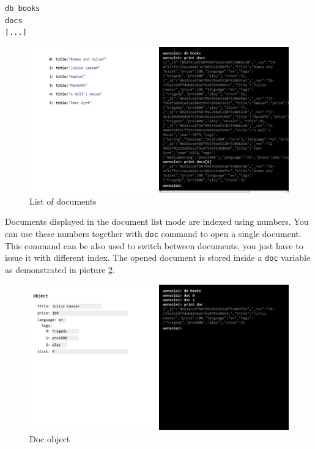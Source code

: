 \begin{verbatim}
db books
docs
[...]
\end{verbatim}
 

\begin{figure}
\centering
\includegraphics[width=\textwidth]{../../manual/screenshot/wonsole2/wonsole2-26.png}
\caption{List of documents}
\label{wonsole2-26}
\end{figure}

Documents displayed in the document list mode are indexed using numbers. You can
use these numbers together with \verb|doc| command to open a single document.
This command can be also used to switch between documents, you just have to
issue it with different index. The opened document is stored inside a \verb|doc|
variable as demonstrated in picture \ref{wonsole2-32}.

\begin{figure}
\centering
\includegraphics[width=\textwidth]{../../manual/screenshot/wonsole2/wonsole2-32.png}
\caption{Doc object}
\label{wonsole2-32}
\end{figure}


